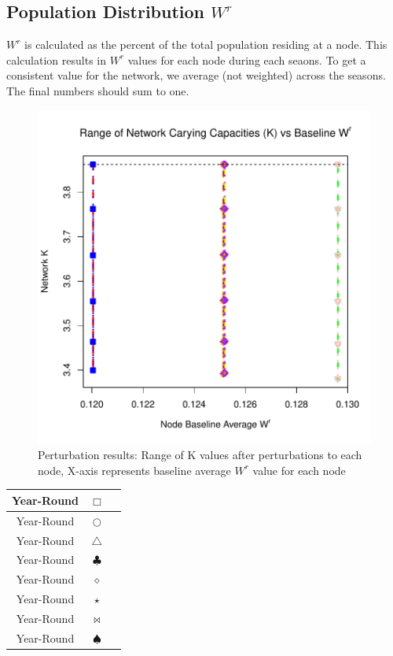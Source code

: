\documentclass[10pt]{article}
\begin{document}
\newpage
\subsection{Population Distribution \texorpdfstring{$W^r$}{WR}}

$W^r$ is calculated as the percent of the total population residing at a node. This calculation results in $W^r$ values for each node during each seaons. To get a consistent value for the network, we average (not weighted) across the seasons. The final numbers should sum to one.


\vspace{-.5cm}
\begin{figure}[H]
\begin{center}
\includegraphics[width=.8\textwidth, height=.8\textwidth]{RGraphics-plant_barcr_WR}
\caption{Perturbation results: Range of K values after perturbations to each node, X-axis represents baseline average $W^r$ value for each node}\label{fig:plant_barcr_WR}
\end{center}
\end{figure}

\vspace{-.5cm}
\begin{tabular}{|c|c|c|}
\hline
{\color{red} Year-Round} & $\Box$ & \\
\hline
{\color{green} Year-Round} & $\bigcirc$ & \\
\hline
{\color{yellow} Year-Round} & $\triangle$ & \\
\hline
{\color{brown} Year-Round} & $\clubsuit$ & \\
\hline
{\color{orange} Year-Round} & $\diamond$ & \\
\hline
{\color{purple} Year-Round} & $\star$ & \\
\hline
{\color{pink} Year-Round} & $\bowtie$ & \\
\hline
{\color{blue} Year-Round} & $\spadesuit$ \\
\hline
\end{tabular}
\end{document}
